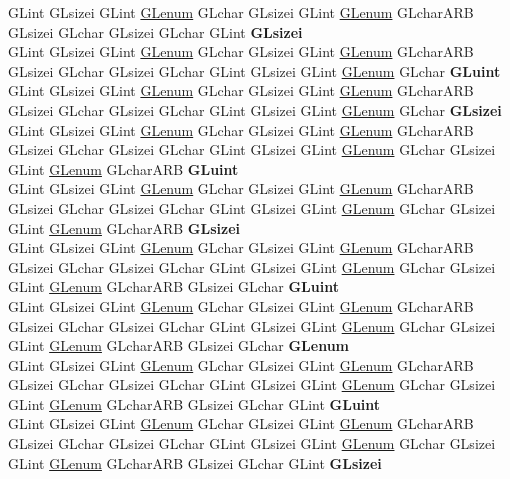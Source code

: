 \begin{DoxyCompactItemize}
\begin{tabbing}
\>GLint GLsizei GLint \hyperlink{interfacevoid}{GLenum} GLchar GLsizei GLint \hyperlink{interfacevoid}{GLenum} GLcharARB GLsizei GLchar GLsizei GLchar GLint {\bfseries GLsizei}\\
\>GLint GLsizei GLint \hyperlink{interfacevoid}{GLenum} GLchar GLsizei GLint \hyperlink{interfacevoid}{GLenum} GLcharARB GLsizei GLchar GLsizei GLchar GLint GLsizei GLint \hyperlink{interfacevoid}{GLenum} GLchar {\bfseries GLuint}\\
\>GLint GLsizei GLint \hyperlink{interfacevoid}{GLenum} GLchar GLsizei GLint \hyperlink{interfacevoid}{GLenum} GLcharARB GLsizei GLchar GLsizei GLchar GLint GLsizei GLint \hyperlink{interfacevoid}{GLenum} GLchar {\bfseries GLsizei}\\
\>GLint GLsizei GLint \hyperlink{interfacevoid}{GLenum} GLchar GLsizei GLint \hyperlink{interfacevoid}{GLenum} GLcharARB GLsizei GLchar GLsizei GLchar GLint GLsizei GLint \hyperlink{interfacevoid}{GLenum} GLchar GLsizei GLint \hyperlink{interfacevoid}{GLenum} GLcharARB {\bfseries GLuint}\\
\>GLint GLsizei GLint \hyperlink{interfacevoid}{GLenum} GLchar GLsizei GLint \hyperlink{interfacevoid}{GLenum} GLcharARB GLsizei GLchar GLsizei GLchar GLint GLsizei GLint \hyperlink{interfacevoid}{GLenum} GLchar GLsizei GLint \hyperlink{interfacevoid}{GLenum} GLcharARB {\bfseries GLsizei}\\
\>GLint GLsizei GLint \hyperlink{interfacevoid}{GLenum} GLchar GLsizei GLint \hyperlink{interfacevoid}{GLenum} GLcharARB GLsizei GLchar GLsizei GLchar GLint GLsizei GLint \hyperlink{interfacevoid}{GLenum} GLchar GLsizei GLint \hyperlink{interfacevoid}{GLenum} GLcharARB GLsizei GLchar {\bfseries GLuint}\\
\>GLint GLsizei GLint \hyperlink{interfacevoid}{GLenum} GLchar GLsizei GLint \hyperlink{interfacevoid}{GLenum} GLcharARB GLsizei GLchar GLsizei GLchar GLint GLsizei GLint \hyperlink{interfacevoid}{GLenum} GLchar GLsizei GLint \hyperlink{interfacevoid}{GLenum} GLcharARB GLsizei GLchar {\bfseries GLenum}\\
\>GLint GLsizei GLint \hyperlink{interfacevoid}{GLenum} GLchar GLsizei GLint \hyperlink{interfacevoid}{GLenum} GLcharARB GLsizei GLchar GLsizei GLchar GLint GLsizei GLint \hyperlink{interfacevoid}{GLenum} GLchar GLsizei GLint \hyperlink{interfacevoid}{GLenum} GLcharARB GLsizei GLchar GLint {\bfseries GLuint}\\
\>GLint GLsizei GLint \hyperlink{interfacevoid}{GLenum} GLchar GLsizei GLint \hyperlink{interfacevoid}{GLenum} GLcharARB GLsizei GLchar GLsizei GLchar GLint GLsizei GLint \hyperlink{interfacevoid}{GLenum} GLchar GLsizei GLint \hyperlink{interfacevoid}{GLenum} GLcharARB GLsizei GLchar GLint {\bfseries GLsizei}\\

\end{tabbing}
\end{DoxyCompactItemize}
